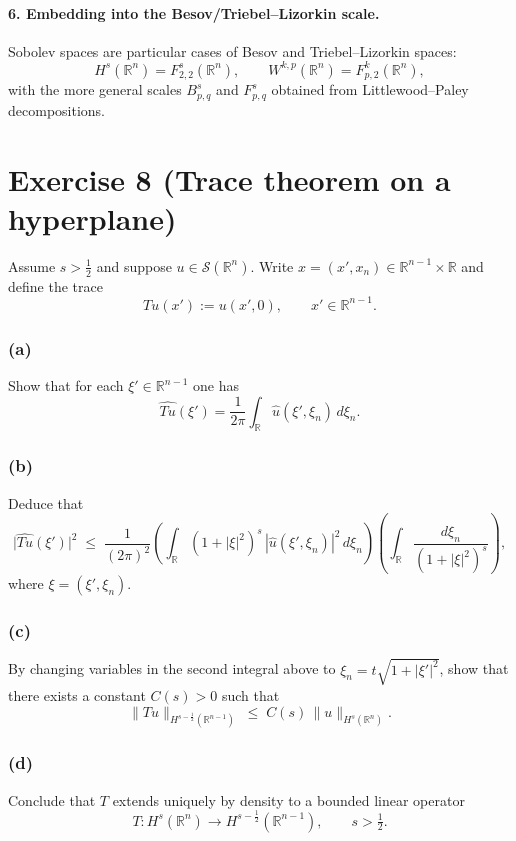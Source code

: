 \documentclass[12pt,a4paper]{article}
\theoremstyle{plain}
\theoremstyle{definition}
\theoremstyle{remark}
\theoremstyle{remark}
\begin{document}
\paragraph{6. Embedding into the Besov/Triebel--Lizorkin scale.}
Sobolev spaces are particular cases of Besov and Triebel--Lizorkin spaces:
\[
H^s(\mathbb R^n) = F_{2,2}^s(\mathbb R^n),\qquad
W^{k,p}(\mathbb R^n) = F_{p,2}^k(\mathbb R^n),
\]
with the more general scales $B_{p,q}^s$ and $F_{p,q}^s$ obtained from Littlewood--Paley decompositions.

\section*{Exercise 8 (Trace theorem on a hyperplane)}

Assume $s>\tfrac12$ and suppose $u\in\mathcal S(\mathbb R^n)$.
Write $x=(x',x_n)\in\mathbb R^{n-1}\times\mathbb R$ and define the trace
\[
Tu(x') := u(x',0),\qquad x'\in\mathbb R^{n-1}.
\]

\subsubsection*{(a)}
Show that for each $\xi'\in\mathbb R^{n-1}$ one has
\[
\widehat{Tu}(\xi') = \frac{1}{2\pi}\int_{\mathbb R}\widehat u(\xi',\xi_n)\,d\xi_n.
\]

\subsubsection*{(b)}
Deduce that
\[
\bigl|\widehat{Tu}(\xi')\bigr|^2
\;\le\;
\frac{1}{(2\pi)^2}
\left(\int_{\mathbb R} (1+|\xi|^2)^s\,|\widehat u(\xi',\xi_n)|^2\,d\xi_n\right)
\left(\int_{\mathbb R}\frac{d\xi_n}{(1+|\xi|^2)^s}\right),
\]
where $\xi=(\xi',\xi_n)$.

\subsubsection*{(c)}
By changing variables in the second integral above to
$\xi_n = t\sqrt{1+|\xi'|^2}$, show that there exists a constant $C(s)>0$
such that
\[
\|Tu\|_{H^{s-\frac12}(\mathbb R^{n-1})}
\;\le\; C(s)\,\|u\|_{H^s(\mathbb R^n)}.
\]

\subsubsection*{(d)}
Conclude that $T$ extends uniquely by density to a bounded linear operator
\[
T:H^s(\mathbb R^n)\longrightarrow H^{s-\frac12}(\mathbb R^{n-1}),
\qquad s>\tfrac12.
\]
\end{document}
